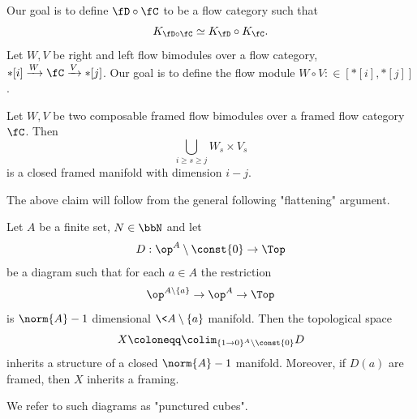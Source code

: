 Our goal is to define $\fD \circ \fC$ to be a flow category such that
\begin{equation*}
    K_{\fD \circ \fC} \simeq K_{\fD} \circ K_{\fC}.
\end{equation*}
Let $W,V$ be right and left flow bimodules over a flow category, $*[i] \xrightarrow{W} \fC \xrightarrow{V} *[j]$. Our goal is to define the flow module $W \circ V: \in [*[i],*[j]]$.

\begin{claim}
    Let $W,V$ be two composable framed flow bimodules over a framed flow category $\fC$. Then 
    \begin{equation*}
        \bigcup_{i \geq s \geq j} W_s\times V_s
    \end{equation*}
    is a closed framed manifold with dimension $i-j$.
\end{claim}

The above claim will follow from the general following "flattening" argument.
\begin{lem}\label{lem:colimIsMfld}
    Let $A$ be a finite set, $N \in \bbN$ and let 
    \begin{equation*}
        D: \op^A \setminus \const{0} \to \Top
    \end{equation*}
    be a diagram such that for each $a \in A$ the restriction
    \begin{equation*}
        \op^{A\setminus \{a\}} \to \op^{A} \to \Top
    \end{equation*}
    is $\norm{A}-1$ dimensional $\<{A \setminus\{a\}}$ manifold. Then the topological space
    \begin{equation*}
        X \coloneqq \colim_{\{1\to 0\}^A \setminus \const{0}} D
    \end{equation*}
    inherits a structure of a closed $\norm{A}-1$ manifold. Moreover, if $D(a)$ are framed, then $X$ inherits a framing.
\end{lem}
We refer to such diagrams as "punctured cubes".

